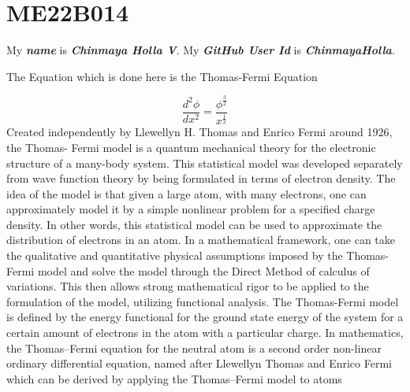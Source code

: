 

\section{ME22B014}
My \textbf{\textit{name}} is  \textbf{\textit{Chinmaya Holla V}}.\newline
My \textbf{\textit{GitHub User Id}} is \textbf{\textit{ChinmayaHolla}}.
\newline

The Equation which is done here is the Thomas-Fermi Equation

\begin{equation}
\frac{d^2 \phi}{dx^2} = \frac{\phi^\frac{3}{2}}{x^\frac{1}{2}}
\label{eqn:i}
\end{equation}
\newline
\newline
Created independently by Llewellyn H. Thomas and Enrico Fermi around 1926, the Thomas-
Fermi model is a quantum mechanical theory for the electronic structure of a many-body
system. This statistical model was developed separately from wave function theory by being
formulated in terms of electron density. The idea of the model is that given a large atom,
with many electrons, one can approximately model it by a simple nonlinear problem for a
specified charge density. In other words, this statistical model can be used to approximate
the distribution of electrons in an atom. In a mathematical framework, one can take the
qualitative and quantitative physical assumptions imposed by the Thomas-Fermi model and
solve the model through the Direct Method of calculus of variations. This then allows
strong mathematical rigor to be applied to the formulation of the model, utilizing functional
analysis. The Thomas-Fermi model is defined by the energy functional for the ground state
energy of the system for a certain amount of electrons in the atom with a particular charge.
\newline
\newline
In mathematics, the Thomas–Fermi equation for the neutral atom is a second order non-linear ordinary differential equation, named after Llewellyn Thomas and Enrico Fermi which can be derived by applying the Thomas–Fermi model to atoms
\newline
\newline

